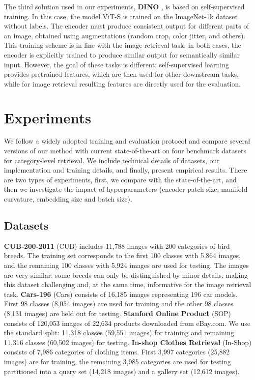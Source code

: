 \documentclass[10pt,twocolumn,letterpaper]{article}
\begin{document}
The third solution used in our experiments, {\bf DINO} \cite{dino}, is based on self-supervised training. In this case, the model ViT-S is trained on the ImageNet-1k dataset \cite{imagenet1k} without labels. The encoder must produce consistent output for different parts of an image, obtained using augmentations (random crop, color jitter, and others). This training scheme is in line with the image retrieval task; in both cases, the encoder is explicitly trained to produce similar output for semantically similar input. However, the goal of these tasks is different: self-supervised learning provides pretrained features, which are then used for other downstream tasks, while for image retrieval resulting features are directly used for the evaluation.

\section{Experiments}
\label{sec:exp}
We follow a widely adopted training and evaluation protocol \cite{proxy_anchor} and compare several versions of our method with current state-of-the-art on four benchmark datasets for category-level retrieval. We include technical details of datasets, our implementation and training details, and finally, present empirical results. There are two types of experiments, first, we compare with the state-of-the-art, and then we investigate the impact of hyperparameters (encoder patch size, manifold curvature, embedding size and batch size).

\subsection{Datasets}
\label{sec:data}
{\bf CUB-200-2011} (CUB) \cite{cub200} includes 11,788 images with 200 categories of bird breeds. The training set corresponds to the first 100 classes with 5,864 images, and the remaining 100 classes with 5,924 images are used for testing. The images are very similar; some breeds can only be distinguished by minor details, making this dataset challenging and, at the same time, informative for the image retrieval task.
{\bf Cars-196} (Cars) \cite{cars196} consists of 16,185 images representing 196 car models. First 98 classes (8,054 images) are used for training and the other 98 classes (8,131 images) are held out 
for testing.
{\bf Stanford Online Product} (SOP) \cite{sop} consists of 120,053 images of 22,634 products downloaded from eBay.com.  We use the standard split: 11,318 classes (59,551 images) for training and remaining 11,316 classes (60,502 images) for testing.
{\bf In-shop Clothes Retrieval} (In-Shop) \cite{inshop} consists of 7,986 categories of clothing items. First 3,997 categories (25,882 images) are for training, the remaining 3,985 categories are used for testing partitioned into a query set (14,218 images) and a gallery set (12,612 images).
\end{document}
